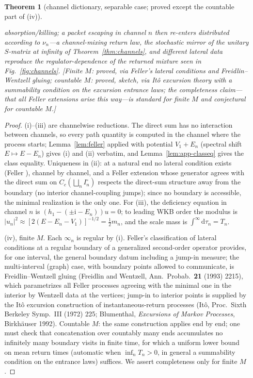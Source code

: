 \documentclass[11pt]{article}
\newtheorem{theorem}{Theorem}[section]
\theoremstyle{definition}
\theoremstyle{remark}
\newcommand{\dd}{\mathrm{d}}
\newcommand{\ii}{\mathrm{i}}
\begin{document}
\begin{theorem}[channel dictionary, separable case; proved except the
countable part of (iv)]
\begin{itemize}
absorption/killing; a packet escaping in channel $n$ then re-enters
distributed according to $\nu_{n}$---a channel-\emph{mixing} return
law, the stochastic mirror of the unitary $S$-matrix at infinity of
Theorem~\ref{thm:channels}, and different lateral data reproduce the
regulator-dependence of the returned mixture seen in
Fig.~\ref{fig:channels}. \emph{[Finite $M$: proved, via Feller's
lateral conditions and Freidlin--Wentzell gluing; countable $M$:
proved, sketch, via It\^o excursion theory with a summability condition
on the excursion entrance laws; the completeness claim---that all
Feller extensions arise this way---is standard for finite $M$ and
conjectural for countable $M$.]}
\end{itemize}
\end{theorem}

\begin{proof}
(i)--(iii) are channelwise reductions. The direct sum has no
interaction between channels, so every path quantity is computed in the
channel where the process starts; Lemma~\ref{lem:feller} applied with
potential $V_{1}+E_{n}$ (spectral shift $E\mapsto E-E_{n}$) gives (i)
and (ii) verbatim, and Lemma~\ref{lem:app-classeq} gives the class
equality. Uniqueness in (ii): at a natural end no lateral condition
exists (Feller \cite{Feller1952,Feller1957}), channel by channel, and a
Feller extension whose generator agrees with the direct sum on
$C_{c}(\bigsqcup_{n}I_{n}^{\circ})$ respects the direct-sum structure away
from the boundary (no interior channel-coupling jumps); since no boundary is
accessible, the minimal realization is the only one. For (iii), the
deficiency equation in channel $n$ is
$(h_{1}-(\pm\ii-E_{n}))u=0$; to leading WKB order the modulus is
$|u_{n}|^{2}\approx[2(E-E_{n}-V_{1})]^{-1/2}=\tfrac12 m_{n}$, and the
scale mass is $\int^{\infty}\dd\tau_{n}=T_{n}$.

(iv), finite $M$. Each $\infty_{n}$ is regular by (i). Feller's
classification of lateral conditions at a regular boundary of a
generalized second-order operator \cite{Feller1957} provides, for one
interval, the general boundary datum including a jump-in measure; the
multi-interval (graph) case, with boundary points allowed to
communicate, is Freidlin--Wentzell gluing (Freidlin and Wentzell,
Ann.\ Probab.\ \textbf{21} (1993) 2215), which parametrizes all Feller
processes agreeing with the minimal one in the interior by Wentzell
data at the vertices; jump-in to interior points is supplied by the
It\^o excursion construction of instantaneous-return processes (It\^o,
Proc.\ Sixth Berkeley Symp.\ III (1972) 225; Blumenthal,
\emph{Excursions of Markov Processes}, Birkh\"auser 1992). Countable
$M$: the same construction applies end by end; one must check that
concatenation over countably many ends accumulates no infinitely many
boundary visits in finite time, for which a uniform lower bound on mean
return times (automatic when $\inf_{n}T_{n}>0$, in general a
summability condition on the entrance laws) suffices. We assert
completeness only for finite $M$.
\end{proof}
\end{document}
